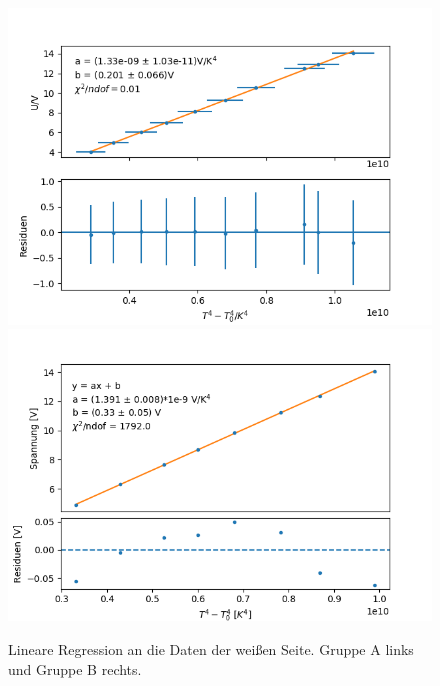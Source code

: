\documentclass[12pt,a4paper]{article}
\begin{document}
\begin{figure}[H]
\centering
\includegraphics[scale=0.5]{Bilder/Weiss_A}
\includegraphics[scale=0.5]{Bilder/weiss_B}
\caption{Lineare Regression an die Daten der weißen Seite. Gruppe A links und Gruppe B rechts.}
\label{fig:RegWeiss}
\end{figure}
\end{document}
